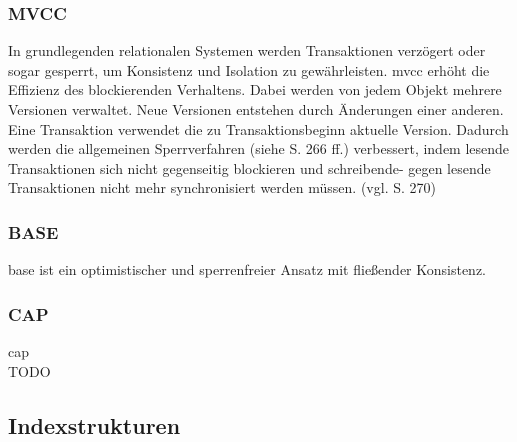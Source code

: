 \subsubsection{MVCC}
In grundlegenden relationalen Systemen werden Transaktionen verzögert oder sogar gesperrt, um Konsistenz und Isolation zu gewährleisten.
\Gls{mvcc} erhöht die Effizienz des  blockierenden Verhaltens.
Dabei werden von jedem Objekt mehrere Versionen verwaltet.
Neue Versionen entstehen durch Änderungen einer anderen.
Eine Transaktion verwendet die zu Transaktionsbeginn aktuelle Version.
Dadurch werden die allgemeinen Sperrverfahren (siehe \cite{book:kudrass} S. 266 ff.) verbessert, indem lesende Transaktionen sich nicht gegenseitig blockieren und schreibende- gegen lesende Transaktionen nicht mehr synchronisiert werden müssen. (vgl. \cite{book:kudrass} S. 270)

\subsubsection{BASE}
\Gls{base} ist ein optimistischer und sperrenfreier Ansatz mit fließender Konsistenz.
\cite{book:nosql-einfuehrung}

\subsubsection{CAP}
\Gls{cap}\\
TODO






\subsection{Indexstrukturen}

